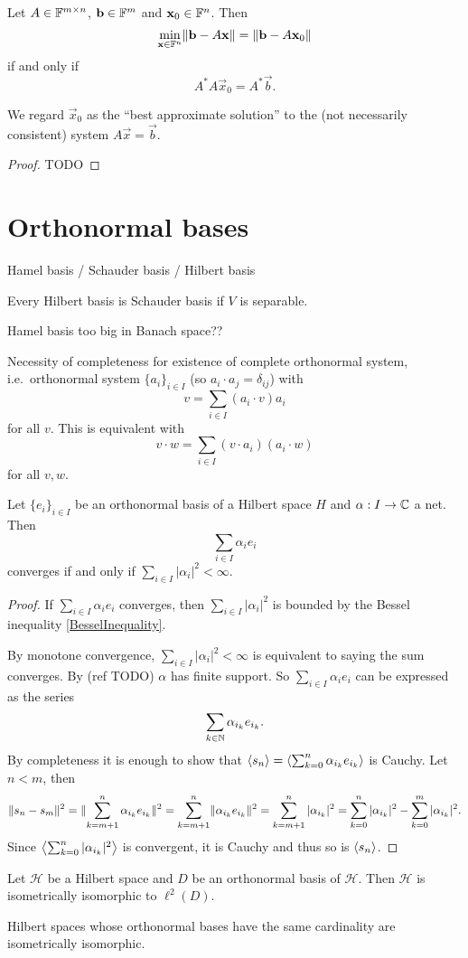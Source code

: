 \begin{proposition}
Let $A\in\mathbb{F}^{m\times n}$, $\boldsymbol{\mathrm{b}}\in\mathbb{F}^m$ and $\boldsymbol{\mathrm{x}}_0\in\mathbb{F}^n$. Then
\[ \min_{\boldsymbol{\mathrm{x}}\in\mathbb{F}^n}\lVert\boldsymbol{\mathrm{b}}-A \boldsymbol{\mathrm{x}}\rVert = \lVert\boldsymbol{\mathrm{b}} - A \boldsymbol{\mathrm{x}}_0\rVert \]
if and only if
\[ A^*A \vec{x}_0 = A^* \vec{b}. \]
\end{proposition}
We regard $\vec{x}_0$ as the ``best approximate solution'' to the (not necessarily consistent) system $A \vec{x} = \vec{b}$.
\begin{proof}
TODO
\end{proof}

\section{Orthonormal bases}

Hamel basis / Schauder basis / Hilbert basis

Every Hilbert basis is Schauder basis if $V$ is separable.

Hamel basis too big in Banach space??

Necessity of completeness for existence of complete orthonormal system, i.e.\ orthonormal system $\{a_i\}_{i\in I}$ (so $a_i \cdot a_j = \delta_{ij}$) with
\[ v = \sum_{i\in I}(a_i \cdot v)a_i \]
for all $v$. This is equivalent with
\[ v \cdot w = \sum_{i\in I}(v\cdot a_i)(a_i \cdot w) \]
for all $v,w$.


\begin{theorem}
Let $\{e_i\}_{i\in I}$ be an orthonormal basis of a Hilbert space $H$ and $\alpha: I\to \mathbb{C}$ a net. Then
\[ \sum_{i\in I}\alpha_i e_i \]
converges \textup{if and only if} $\sum_{i\in I}|\alpha_i|^2 < \infty$. 
\end{theorem}
\begin{proof}
If $\sum_{i\in I}\alpha_i e_i$ converges, then $\sum_{i\in I}|\alpha_i|^2$ is bounded by the Bessel inequality \ref{BesselInequality}.

By monotone convergence, $\sum_{i\in I}|\alpha_i|^2 < \infty$ is equivalent to saying the sum converges. By (ref TODO) $\alpha$ has finite support. So $\sum_{i\in I}\alpha_i e_i$ can be expressed as the series
\[ \sum_{k\in \mathbb{N}}\alpha_{i_k} e_{i_k}. \]
By completeness it is enough to show that $\left\langle s_n \right\rangle = \left\langle \sum_{k=0}^n\alpha_{i_k} e_{i_k} \right\rangle$ is Cauchy. Let $n < m$, then
\[ \lVert s_n - s_m\rVert^2 = \lVert\sum_{k=m+1}^n\alpha_{i_k} e_{i_k}\rVert^2 = \sum_{k=m+1}^n\lVert\alpha_{i_k} e_{i_k}\rVert^2 = \sum_{k=m+1}^n |\alpha_{i_k}|^2 = \sum_{k=0}^n|\alpha_{i_k}|^2 -\sum_{k=0}^m|\alpha_{i_k}|^2.  \]
Since $\left\langle \sum_{k=0}^n |\alpha_{i_k}|^2 \right\rangle$ is convergent, it is Cauchy and thus so is $\left\langle s_n \right\rangle$.
\end{proof}
\begin{corollary}
Let $\mathcal{H}$ be a Hilbert space and $D$ be an orthonormal basis of $\mathcal{H}$. Then $\mathcal{H}$ is isometrically isomorphic to $\ell^2(D)$.
\end{corollary}
\begin{corollary}
Hilbert spaces whose orthonormal bases have the same cardinality are isometrically isomorphic.
\end{corollary}


